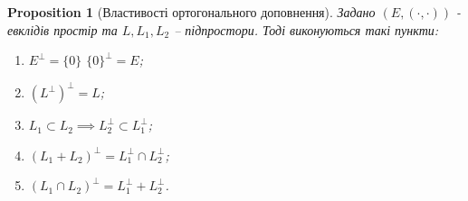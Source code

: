 \documentclass[a4paper, 10pt]{article}
\theoremstyle{theoremdd}
\newtheorem{proposition}[theorem]{Proposition}
\begin{document}
\begin{proposition}[Властивості ортогонального доповнення]
Задано $(E,(\cdot,\cdot))$ - евклідів простір та $L,L_1,L_2$ -- підпростори. Тоді виконуються такі пункти:
\begin{enumerate}[nosep, wide=0pt, label={\arabic*)}]
\item $E^{\perp} = \{0\}$ \qquad $\{0\}^{\perp} = E$;
\item $(L^{\perp})^{\perp} = L$;
\item $L_1 \subset L_2 \implies L_2^{\perp} \subset L_1^{\perp}$;
\item $(L_1+L_2)^{\perp} = L_1^{\perp} \cap L_2^{\perp}$;
\item $(L_1 \cap L_2)^{\perp} = L_1^{\perp} + L_2^{\perp}$.
\end{enumerate}
\end{proposition}
\end{document}
